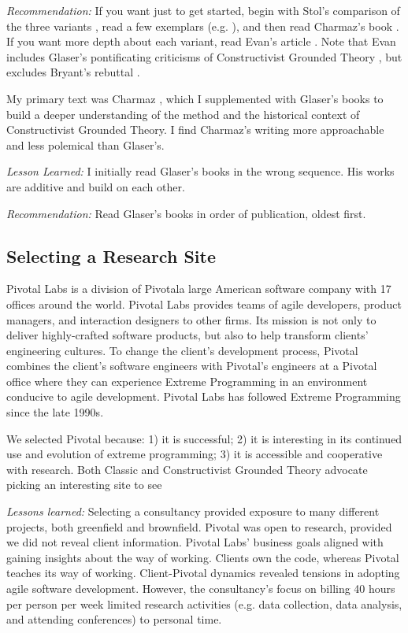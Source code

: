 \textit{Recommendation:} If you want just to get started, begin with Stol's comparison of the three variants \cite{StolGroundedTheory}, read a few exemplars (e.g. \cite{SedanoSustainableSoftware, SedanoSoftwareDevelopmentWaste}), and then read Charmaz's book \cite{Charmaz}. If you want more depth about each variant, read Evan's article \cite{Evans2013novice}. Note that Evan includes Glaser's pontificating criticisms of Constructivist Grounded Theory \cite{GlaserConstructivistGroundedTheory}, but excludes Bryant's rebuttal \cite{Bryant2007}. 

My primary text was Charmaz \cite{Charmaz}, which I supplemented with Glaser's books \cite{GlaserDiscovery, GlaserTheoreticalSensitivity, GlaserIssues} to build a deeper understanding of the method and the historical context of Constructivist Grounded Theory. I find Charmaz's writing more approachable and less polemical than Glaser's. 

\textit{Lesson Learned:} I initially read Glaser's books in the wrong sequence. His works are additive and build on each other.

\textit{Recommendation:} Read Glaser's books in order of publication, oldest first. 
\subsection{Selecting a Research Site}
Pivotal Labs is a division of Pivotal\textemdash a large American software company with 17 offices around the world. Pivotal Labs provides teams of agile developers, product managers, and interaction designers to other firms. Its mission is not only to deliver highly-crafted software products, but also to help transform clients' engineering cultures. To change the client's development process, Pivotal combines the client's software engineers with Pivotal's engineers at a Pivotal office where they can experience Extreme Programming \cite{BeckExtremeProgramming2004} in an environment conducive to agile development. Pivotal Labs has followed Extreme Programming \cite{BeckExtremeProgramming2004} since the late 1990s. 

We selected Pivotal because: 1) it is successful; 2) it is interesting in its continued use and evolution of extreme programming; 3) it is accessible and cooperative with research. Both Classic and Constructivist Grounded Theory advocate picking an interesting site to see  

\textit{Lessons learned:} Selecting a consultancy provided exposure to many different projects, both greenfield and brownfield. Pivotal was open to research, provided we did not reveal client information. Pivotal Labs' business goals aligned with gaining insights about the way of working. Clients own the code, whereas Pivotal teaches its way of working. Client-Pivotal dynamics revealed tensions in adopting agile software development. However, the consultancy's focus on billing 40 hours per person per week limited research activities (e.g. data collection, data analysis, and attending conferences) to personal time.

